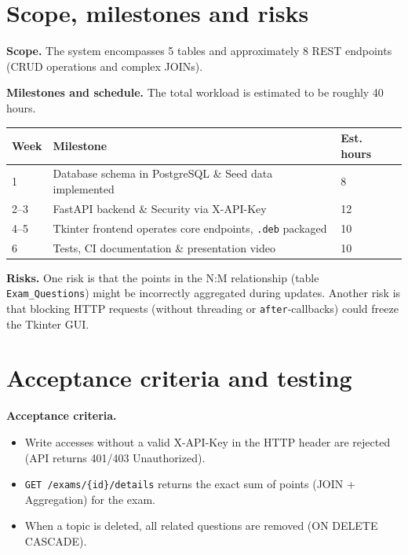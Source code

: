 \documentclass[11pt,a4paper]{article}
\begin{document}
\section{Scope, milestones and risks}

\textbf{Scope.} The system encompasses 5 tables and approximately 8 REST endpoints (CRUD operations and complex JOINs).

\textbf{Milestones and schedule.} The total workload is estimated to be roughly 40 hours.

\renewcommand{\arraystretch}{1.2}
\begin{tabularx}{\linewidth}{@{}p{1.4cm}Xp{1.8cm}@{}}
\toprule
\textbf{Week} & \textbf{Milestone} & \textbf{Est. hours} \\
\midrule
1   & Database schema in PostgreSQL \& Seed data implemented & 8 \\
2--3 & FastAPI backend \& Security via X-API-Key & 12 \\
4--5 & Tkinter frontend operates core endpoints, \texttt{.deb} packaged & 10 \\
6   & Tests, CI documentation \& presentation video & 10 \\
\bottomrule
\end{tabularx}

\textbf{Risks.} One risk is that the points in the N:M relationship (table \texttt{Exam\_Questions}) might be incorrectly aggregated during updates. Another risk is that blocking HTTP requests (without threading or \texttt{after}-callbacks) could freeze the Tkinter GUI.

\section{Acceptance criteria and testing}

\textbf{Acceptance criteria.}
\begin{itemize}[topsep=2pt]
  \item Write accesses without a valid X-API-Key in the HTTP header are rejected (API returns 401/403 Unauthorized).
  \item \texttt{GET /exams/\{id\}/details} returns the exact sum of points (JOIN + Aggregation) for the exam.
  \item When a topic is deleted, all related questions are removed (ON DELETE CASCADE).
\end{itemize}
\end{document}
